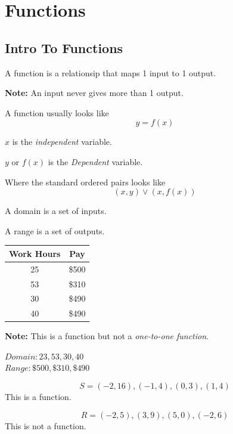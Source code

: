 \section{Functions}
\subsection{Intro To Functions}

\begin{definition}[Function]
  A function is a relationsip that maps 1 input to 1 output.
\end{definition}

\textbf{Note: }An input never gives more than 1 output.

A function usually looks like $$ y = f(x) $$ 


$ x $ is the \textit{independent} variable.


\noindent $ y $ or $ f(x) $ is the \textit{Dependent} variable.


\noindent Where the standard ordered pairs looks like $$ (x, y) \lor (x, f(x)) $$

\begin{definition}[Domain]
  A domain is a set of inputs.
\end{definition}
\begin{definition}[Range]
  A range is a set of outputs.
\end{definition}

\begin{example}
  \hfill
  \begin{table}[H]
    \centering
    \begin{tabular}{cc}
      \toprule
      \textbf{Work Hours} & \textbf{Pay} \\ \midrule
      25 & \$500 \\
      53 & \$310 \\
      30 & \$490 \\
      40 & \$490 \\ \bottomrule
    \end{tabular}
  \end{table}

  \textbf{Note: }This is a function but not a \textit{one-to-one function}.
  
  $Domain: {23, 53, 30, 40}$\\
  $Range: {\$500, \$310, \$490}$
\end{example}

\begin{example}
  $$S = {(-2, 16), (-1, 4), (0, 3), (1, 4)} $$ This is a function.


  $$R = {(-2, 5), (3, 9), (5, 0), (-2, 6)} $$ This is not a function.
\end{example}

